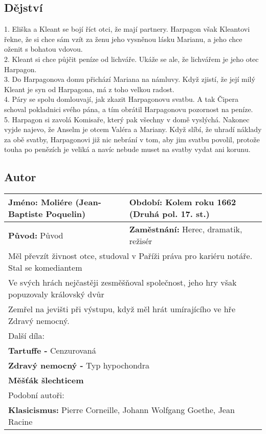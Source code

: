 \subsection*{Dějství}
1. Eliška a Kleant se bojí říct otci, že mají partnery.
Harpagon však Kleantovi řekne, že si chce sám vzít za ženu jeho vysněnou lásku Marianu, a jeho chce oženit s bohatou vdovou. \\
2. Kleant si chce půjčit peníze od lichváře.
Ukáže se ale, že lichvářem je jeho otec Harpagon. \\
3. Do Harpagonova domu přichází Mariana na námluvy.
Když zjistí, že její milý Kleant je syn od Harpagona, má z toho velkou radost. \\
4. Páry se spolu domlouvají, jak zkazit Harpagonovu svatbu.
A tak Čipera schoval pokladnici svého pána, a tím obrátil Harpagonovu pozornost na peníze. \\
5. Harpagon si zavolá Komisaře, který pak všechny v domě vyslýchá.
Nakonec vyjde najevo, že Anselm je otcem Valéra a Mariany.
Když slíbí, že uhradí náklady za obě svatby, Harpagonovi již nic nebrání v tom, aby jim svatbu povolil, protože touha po penězích je veliká a navíc nebude muset na svatby vydat ani korunu.
\subsection*{Autor}
\begin{tabularx}{\linewidth}{l|l}
    \textbf{Jméno:} Moliére (Jean-Baptiste Poquelin) & \textbf{Období:} Kolem roku 1662  (Druhá pol. 17. st.)     \\
    \hline
    \textbf{Původ:} Původ                            & \textbf{Zaměstnání:} Herec, dramatik, režisér              \\
    \hline
    \multicolumn{2}{l}{Měl převzít živnost otce, studoval v Paříži práva pro kariéru notáře. Stal se komediantem} \\
    \multicolumn{2}{l}{Ve svých hrách nejčastěji zesměšňoval společnost, jeho hry však popuzovaly královský dvůr} \\
    \multicolumn{2}{l}{Zemřel na jevišti při výstupu, když měl hrát umírajícího ve hře Zdravý nemocný.}           \\
    \hline
    \multicolumn{2}{l}{Další díla:}                                                                               \\
    \multicolumn{2}{l}{\textbf{Tartuffe -} Cenzurovaná}                                                           \\
    \multicolumn{2}{l}{\textbf{Zdravý nemocný -} Typ hypochondra}                                                 \\
    \multicolumn{2}{l}{\textbf{Měšťák šlechticem}}                                                                \\
    \hline
    \multicolumn{2}{l}{Podobní autoři:}                                                                           \\
    \multicolumn{2}{l}{\textbf{Klasicismus:} Pierre Corneille, Johann Wolfgang Goethe, Jean Racine}               \\
\end{tabularx}

